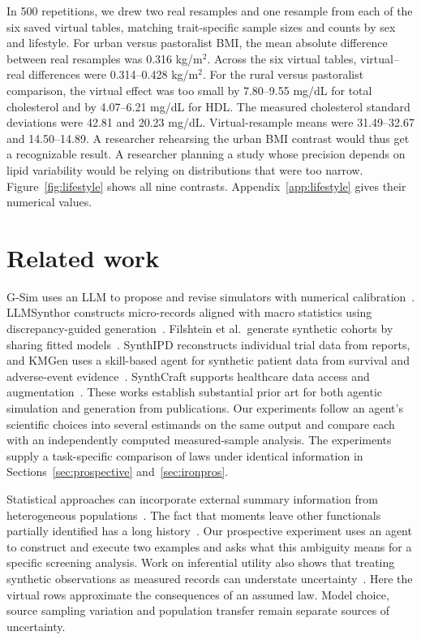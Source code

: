 \documentclass[sigconf,anonymous,review]{acmart}
\begin{document}
In 500 repetitions, we drew two real resamples and one resample from each of the six saved virtual tables, matching trait-specific sample sizes and counts by sex and lifestyle. For urban versus pastoralist BMI, the mean absolute difference between real resamples was 0.316 kg/m$^2$. Across the six virtual tables, virtual--real differences were 0.314--0.428 kg/m$^2$. For the rural versus pastoralist comparison, the virtual effect was too small by 7.80--9.55 mg/dL for total cholesterol and by 4.07--6.21 mg/dL for HDL. The measured cholesterol standard deviations were 42.81 and 20.23 mg/dL. Virtual-resample means were 31.49--32.67 and 14.50--14.89. A researcher rehearsing the urban BMI contrast would thus get a recognizable result. A researcher planning a study whose precision depends on lipid variability would be relying on distributions that were too narrow. Figure~\ref{fig:lifestyle} shows all nine contrasts. Appendix~\ref{app:lifestyle} gives their numerical values.


\section{Related work}
G-Sim uses an LLM to propose and revise simulators with numerical calibration~\cite{gsim}. LLMSynthor constructs micro-records aligned with macro statistics using discrepancy-guided generation~\cite{llmsynthor}. Filshtein et al.\ generate synthetic cohorts by sharing fitted models~\cite{filshtein}. SynthIPD reconstructs individual trial data from reports, and KMGen uses a skill-based agent for synthetic patient data from survival and adverse-event evidence~\cite{synthipd,kmgen}. SynthCraft supports healthcare data access and augmentation~\cite{synthcraft}. These works establish substantial prior art for both agentic simulation and generation from publications. Our experiments follow an agent's scientific choices into several estimands on the same output and compare each with an independently computed measured-sample analysis. The experiments supply a task-specific comparison of laws under identical information in Sections~\ref{sec:prospective} and~\ref{sec:ironpros}.

Statistical approaches can incorporate external summary information from heterogeneous populations~\cite{syndi}. The fact that moments leave other functionals partially identified has a long history~\cite{bounds}. Our prospective experiment uses an agent to construct and execute two examples and asks what this ambiguity means for a specific screening analysis. Work on inferential utility also shows that treating synthetic observations as measured records can understate uncertainty~\cite{inferential}. Here the virtual rows approximate the consequences of an assumed law. Model choice, source sampling variation and population transfer remain separate sources of uncertainty.
\end{document}
